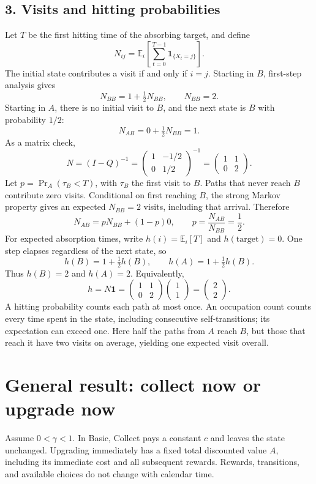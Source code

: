 \documentclass[11pt]{article}
\theoremstyle{remark}\newtheorem{remark}[definition]{Remark}
\begin{document}
\subsection*{3. Visits and hitting probabilities}
Let $T$ be the first hitting time of the absorbing target, and define
\[
N_{ij}=\mathbb E_i\!\left[\sum_{t=0}^{T-1}\mathbf1_{\{X_t=j\}}\right].
\]
The initial state contributes a visit if and only if $i=j$. Starting in $B$, first-step analysis gives
\[
N_{BB}=1+\tfrac12 N_{BB},\qquad \boxed{N_{BB}=2}.
\]
Starting in $A$, there is no initial visit to $B$, and the next state is $B$ with probability $1/2$:
\[
N_{AB}=0+\tfrac12 N_{BB}=1.
\]
As a matrix check,
\[
N=(I-Q)^{-1}
=\begin{pmatrix}1&-1/2\\0&1/2\end{pmatrix}^{-1}
=\begin{pmatrix}1&1\\0&2\end{pmatrix}.
\]
Let $p=\Pr_A(\tau_B<T)$, with $\tau_B$ the first visit to $B$. Paths that never reach $B$ contribute zero visits. Conditional on first reaching $B$, the strong Markov property gives an expected $N_{BB}=2$ visits, including that arrival. Therefore
\[
N_{AB}=pN_{BB}+(1-p)0,
\qquad \boxed{p=\frac{N_{AB}}{N_{BB}}=\frac12.}
\]
For expected absorption times, write $h(i)=\mathbb E_i[T]$ and $h(\text{target})=0$. One step elapses regardless of the next state, so
\[
h(B)=1+\tfrac12h(B),\qquad
h(A)=1+\tfrac12h(B).
\]
Thus $h(B)=2$ and $\boxed{h(A)=2}$. Equivalently,
\[
h=N\mathbf1=\begin{pmatrix}1&1\\0&2\end{pmatrix}
\begin{pmatrix}1\\1\end{pmatrix}=\begin{pmatrix}2\\2\end{pmatrix}.
\]
A hitting probability counts each path at most once. An occupation count counts every time spent in the state, including consecutive self-transitions; its expectation can exceed one. Here half the paths from $A$ reach $B$, but those that reach it have two visits on average, yielding one expected visit overall.

\clearpage
{}
\section*{General result: collect now or upgrade now}
Assume $0<\gamma<1$. In Basic, Collect pays a constant $c$ and leaves the state unchanged. Upgrading immediately has a fixed total discounted value $A$, including its immediate cost and all subsequent rewards. Rewards, transitions, and available choices do not change with calendar time.
\end{document}
